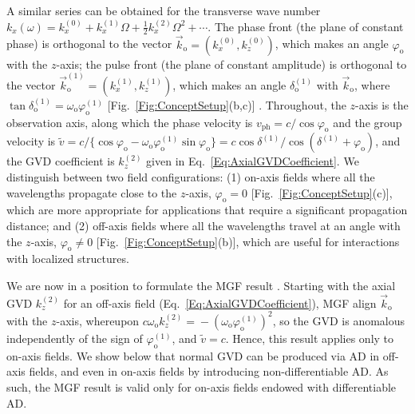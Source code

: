 \documentclass[reprint,
 amsmath,amssymb,
 aps,
]{revtex4-2}
\begin{document}
A similar series can be obtained for the transverse wave number $k_{x}(\omega)\!=\!k_{x}^{(0)}+k_{x}^{(1)}\Omega+\tfrac{1}{2}k_{x}^{(2)}\Omega^{2}+\cdots$. The phase front (the plane of constant phase) is orthogonal to the vector $\vec{k}_{\mathrm{o}}\!=\!(k_{x}^{(0)},k_{z}^{(0)})$, which makes an angle $\varphi_{\mathrm{o}}$ with the $z$-axis; the pulse front (the plane of constant amplitude) is orthogonal to the vector $\vec{k}_{\mathrm{o}}^{(1)}\!=\!(k_{x}^{(1)},k_{z}^{(1)})$, which makes an angle $\delta_{\mathrm{o}}^{(1)}$ with $\vec{k}_{\mathrm{o}}$, where $\tan{\delta_{\mathrm{o}}^{(1)}}\!=\!\omega_{\mathrm{o}}\varphi_{\mathrm{o}}^{(1)}$ [Fig.~\ref{Fig:ConceptSetup}(b,c)] \cite{Hebling96OQE,Porras03PRE2}. Throughout, the $z$-axis is the observation axis, along which the phase velocity is $v_{\mathrm{ph}}\!=\!c/\cos{\varphi_{\mathrm{o}}}$ and the group velocity is $\widetilde{v}\!=\!c/\{\cos{\varphi_{\mathrm{o}}}-\omega_{\mathrm{o}}\varphi_{\mathrm{o}}^{(1)}\sin{\varphi_{\mathrm{o}}}\}\!=\!c\cos{\delta^{(1)}}/\cos{(\delta^{(1)}+\varphi_{\mathrm{o}})}$, and the GVD coefficient is $k_{z}^{(2)}$ given in Eq.~\ref{Eq:AxialGVDCoefficient}. We distinguish between two field configurations: (1) on-axis fields where all the wavelengths propagate close to the $z$-axis, $\varphi_{\mathrm{o}}\!=\!0$ [Fig.~\ref{Fig:ConceptSetup}(c)], which are more appropriate for applications that require a significant propagation distance; and (2) off-axis fields where all the wavelengths travel at an angle with the $z$-axis, $\varphi_{\mathrm{o}}\!\neq\!0$ [Fig.~\ref{Fig:ConceptSetup}(b)], which are useful for interactions with localized structures.

We are now in a position to formulate the MGF result \cite{Martinez84JOSAA}. Starting with the axial GVD $k_{z}^{(2)}$ for an off-axis field (Eq.~\ref{Eq:AxialGVDCoefficient}), MGF align $\vec{k}_{\mathrm{o}}$ with the $z$-axis, whereupon $c\omega_{\mathrm{o}}k_{z}^{(2)}\!=\!-(\omega_{\mathrm{o}}\varphi_{\mathrm{o}}^{(1)})^{2}$, so the GVD is anomalous independently of the sign of $\varphi_{\mathrm{o}}^{(1)}$, and $\widetilde{v}\!=\!c$. Hence, this result applies only to on-axis fields. We show below that normal GVD can be produced via AD in off-axis fields, and even in on-axis fields by introducing non-differentiable AD. As such, the MGF result is valid only for on-axis fields endowed with differentiable AD.
\end{document}
